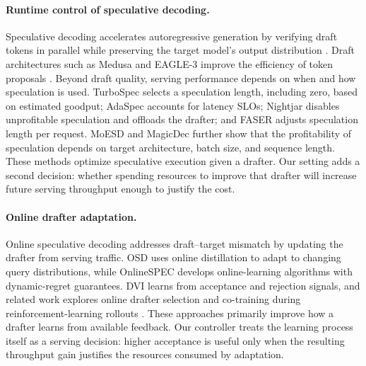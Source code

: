 \documentclass{article}
\begin{document}
\paragraph{Runtime control of speculative decoding.}
Speculative decoding accelerates autoregressive generation by verifying draft tokens in parallel while preserving the target model's output distribution \citep{leviathan2023fast,chen2023accelerating,miao2024specinfer}. Draft architectures such as Medusa and EAGLE-3 improve the efficiency of token proposals \citep{cai2024medusa,li2024eagle,li2024eagle2,li2025eagle3}. Beyond draft quality, serving performance depends on when and how speculation is used. TurboSpec \citep{liu2024turbospec} selects a speculation length, including zero, based on estimated goodput; AdaSpec \citep{huang2025adaspec} accounts for latency SLOs; Nightjar \citep{li2025nightjar} disables unprofitable speculation and offloads the drafter; and FASER \citep{chen2026faser} adjusts speculation length per request. MoESD \citep{huang2025moesd} and MagicDec \citep{sadhukhan2025magicdec} further show that the profitability of speculation depends on target architecture, batch size, and sequence length. These methods optimize speculative execution given a drafter. Our setting adds a second decision: whether spending resources to improve that drafter will increase future serving throughput enough to justify the cost.

\paragraph{Online drafter adaptation.}
Online speculative decoding addresses draft--target mismatch by updating the drafter from serving traffic. OSD \citep{liu2024osd} uses online distillation to adapt to changing query distributions, while OnlineSPEC \citep{qian2026drafts} develops online-learning algorithms with dynamic-regret guarantees. DVI \citep{bhansali2025dvi} learns from acceptance and rejection signals, and related work explores online drafter selection \citep{liu2026notabandit} and co-training during reinforcement-learning rollouts \citep{wang2026cotraining}. These approaches primarily improve how a drafter learns from available feedback. Our controller treats the learning process itself as a serving decision: higher acceptance is useful only when the resulting throughput gain justifies the resources consumed by adaptation.
\end{document}
